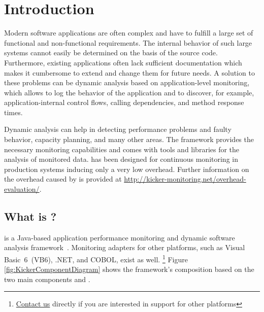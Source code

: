 %


\chapter{Introduction}\label{chap:introduction}

Modern software applications are often complex and have to fulfill a large set of functional and non-functional requirements. The internal behavior of such large systems cannot easily be determined on the basis of the source code. Furthermore, existing applications often lack sufficient documentation which makes it cumbersome to extend and change them for future needs. A solution to these problems can be dynamic analysis based on application-level monitoring, which allows to log the behavior of the application and to discover, for example, application-internal control flows, calling dependencies, and method response times.

Dynamic analysis can help in detecting performance problems and faulty behavior, capacity planning, and many other areas. The \Kicker{} framework provides the necessary monitoring capabilities and comes with tools and libraries for the analysis of monitored data. \Kicker{} has been designed for %
continuous monitoring in production systems inducing only a very low overhead. Further information on the overhead caused by \Kicker{} is provided at \url{http://kicker-monitoring.net/overhead-evaluation/}.

\section{What is \Kicker?}\label{sec:kicker}

\enlargethispage{1cm}

\Kicker{} is a Java-based application performance monitoring and dynamic software analysis framework~\cite{KickerICPE2012}. %
Monitoring adapters for other platforms, such as Visual Basic~6~(VB6), .NET, and COBOL, exist as well.%
\footnote{\href{http://kicker-monitoring.net/support/}{Contact us} directly if you are interested in \Kicker{} support for other platforms} %
Figure \ref{fig:KickerComponentDiagram} shows the framework's composition based %
on the two main components \KickerMonitoringPart{} and \KickerAnalysisPart{}. %

